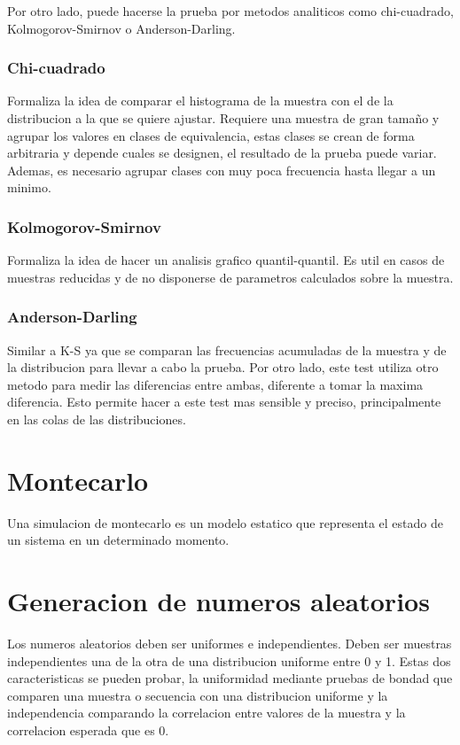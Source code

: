 \documentclass[a4paper]{article}
\begin{document}
Por otro lado, puede hacerse la prueba por metodos analiticos como chi-cuadrado, Kolmogorov-Smirnov o Anderson-Darling.
\subsubsection*{Chi-cuadrado}
Formaliza la idea de comparar el histograma de la muestra con el de la distribucion a la que se quiere ajustar.
Requiere una muestra de gran tamaño y agrupar los valores en clases de equivalencia, estas clases se crean de forma 
arbitraria y depende cuales se designen, el resultado de la prueba puede variar. Ademas, es necesario agrupar clases
con muy poca frecuencia hasta llegar a un minimo.

\subsubsection*{Kolmogorov-Smirnov}
Formaliza la idea de hacer un analisis grafico quantil-quantil.
Es util en casos de muestras reducidas y de no disponerse de parametros calculados sobre la muestra.

\subsubsection*{Anderson-Darling}
Similar a K-S ya que se comparan las frecuencias acumuladas de la muestra y de la distribucion para llevar a cabo
la prueba. Por otro lado, este test utiliza otro metodo para medir las diferencias entre ambas, diferente a tomar
la maxima diferencia. Esto permite hacer a este test mas sensible y preciso, principalmente en las colas de las 
distribuciones.

\section*{Montecarlo}
Una simulacion de montecarlo es un modelo estatico que representa el estado de un sistema en un determinado momento.

\section{Generacion de numeros aleatorios} 
Los numeros aleatorios deben ser uniformes e independientes. Deben ser muestras independientes una
de la otra de una distribucion uniforme entre 0 y 1.
Estas dos caracteristicas se pueden probar, la uniformidad mediante pruebas de bondad que comparen una muestra o
secuencia con una distribucion uniforme y la independencia comparando la correlacion entre valores de la muestra y 
la correlacion esperada que es 0.
\end{document}
